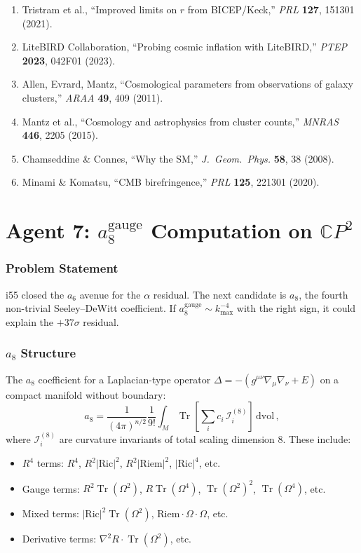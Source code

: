 \documentclass[11pt,a4paper]{article}
\newcommand{\Tr}{\operatorname{Tr}}
\newcommand{\CP}{\mathbb{C}P}
\begin{document}
\begin{enumerate}
\item Tristram et al., ``Improved limits on $r$ from BICEP/Keck,'' \textit{PRL} \textbf{127}, 151301 (2021).
\item LiteBIRD Collaboration, ``Probing cosmic inflation with LiteBIRD,'' \textit{PTEP} \textbf{2023}, 042F01 (2023).
\item Allen, Evrard, Mantz, ``Cosmological parameters from observations of galaxy clusters,'' \textit{ARAA} \textbf{49}, 409 (2011).
\item Mantz et al., ``Cosmology and astrophysics from cluster counts,'' \textit{MNRAS} \textbf{446}, 2205 (2015).
\item Chamseddine \& Connes, ``Why the SM,'' \textit{J.\ Geom.\ Phys.} \textbf{58}, 38 (2008).
\item Minami \& Komatsu, ``CMB birefringence,'' \textit{PRL} \textbf{125}, 221301 (2020).
\end{enumerate}


\part{Agent 7: $a_8^{\mathrm{gauge}}$ Computation on $\CP^2$}
\label{part:a8}

\section{Problem Statement}

i55 closed the $a_6$ avenue for the $\alpha$ residual. The next candidate is $a_8$, the fourth non-trivial Seeley--DeWitt coefficient. If $a_8^{\mathrm{gauge}} \sim k_{\max}^{-4}$ with the right sign, it could explain the $+37\sigma$ residual.

\section{$a_8$ Structure}

The $a_8$ coefficient for a Laplacian-type operator $\Delta = -(g^{\mu\nu}\nabla_\mu\nabla_\nu + E)$ on a compact manifold without boundary:
\begin{equation}
a_8 = \frac{1}{(4\pi)^{n/2}}\frac{1}{9!}\int_M \Tr\left[\sum_i c_i\,\mathcal{I}_i^{(8)}\right]\,\mathrm{dvol}\,,
\end{equation}
where $\mathcal{I}_i^{(8)}$ are curvature invariants of total scaling dimension 8. These include:
\begin{itemize}
\item $R^4$ terms: $R^4$, $R^2|{\mathrm{Ric}}|^2$, $R^2|{\mathrm{Riem}}|^2$, $|\mathrm{Ric}|^4$, etc.
\item Gauge terms: $R^2\Tr(\Omega^2)$, $R\Tr(\Omega^4)$, $\Tr(\Omega^2)^2$, $\Tr(\Omega^4)$, etc.
\item Mixed terms: $|{\mathrm{Ric}}|^2\Tr(\Omega^2)$, $\mathrm{Riem}\cdot\Omega\cdot\Omega$, etc.
\item Derivative terms: $\nabla^2 R \cdot \Tr(\Omega^2)$, etc.
\end{itemize}
\end{document}
